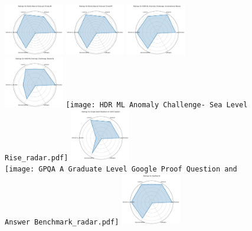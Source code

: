 \documentclass{article}
\begin{document}
\clearpage

\begin{figure}[ht!]
\centering
\includegraphics[width=0.2333\textwidth]{Nixtla Neural Forecast TimeLLM_radar.pdf}
\includegraphics[width=0.2333\textwidth]{Nixtla Neural Forecast TimeGPT_radar.pdf}
\includegraphics[width=0.2333\textwidth]{HDR ML Anomaly Challenge- Gravitational Waves_radar.pdf}
\\[1ex]
\includegraphics[width=0.2333\textwidth]{HDR ML Anomaly Challenge- Butterfly_radar.pdf}
\texttt{[image: HDR ML Anomaly Challenge- Sea Level Rise\_radar.pdf]}
\includegraphics[width=0.2333\textwidth]{Single Qubit Readout on QICK System_radar.pdf}
\\[1ex]
\texttt{[image: GPQA A Graduate Level Google Proof Question and Answer Benchmark\_radar.pdf]}
\includegraphics[width=0.2333\textwidth]{SeafloorAI_radar.pdf}

\end{figure}
\end{document}
